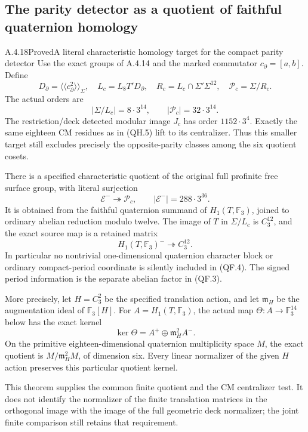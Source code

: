 \subsection{The parity detector as a quotient of faithful quaternion homology}

\begin{result}{A.4.18}{Proved}{A literal characteristic homology target for the compact parity detector}
Use the exact groups of A.4.14 and the marked commutator
$c_\partial=[a,b]$.  Define
\[
 D_\partial=\langle\!\langle c_\partial^2\rangle\!\rangle_\Sigma,
 \quad L_c=L_8T'D_\partial,
 \quad R_c=L_c\cap\Sigma'\Sigma^{12},
 \quad\mathcal P_c=\Sigma/R_c.
                                                        \tag{QF.1}
\]
The actual orders are
\[
 |\Sigma/L_c|=8\cdot3^{14},\qquad
 |\mathcal P_c|=32\cdot3^{14}.                           \tag{QF.2}
\]
The restriction/deck detected modular image $J_c$ has
order $1152\cdot3^4$.  Exactly the same eighteen CM
residues as in (QH.5) lift to its centralizer.  Thus
this smaller target still excludes precisely the
opposite-parity classes among the six quotient cosets.

There is a specified characteristic quotient of the
original full profinite free surface group, with
literal surjection
\[
 \mathcal E^-\twoheadrightarrow\mathcal P_c,
 \qquad |\mathcal E^-|=288\cdot3^{36}.                  \tag{QF.3}
\]
It is obtained from the faithful quaternion summand
of $H_1(T,\mathbb F_3)$, joined to ordinary abelian
reduction modulo twelve.  The image of $T$ in
$\Sigma/L_c$ is $C_3^{12}$, and the exact source map
is a retained matrix
\[
 H_1(T,\mathbb F_3)^-\twoheadrightarrow C_3^{12}.
                                                        \tag{QF.4}
\]
In particular no nontrivial one-dimensional quaternion
character block or ordinary compact-period coordinate
is silently included in (QF.4).  The signed period
information is the separate abelian factor in (QF.3).

More precisely, let $H=C_3^2$ be the specified translation
action, and let $\mathfrak m_H$ be the augmentation ideal
of $\mathbb F_3[H]$.  For $A=H_1(T,\mathbb F_3)$,
the actual map $\Theta:A\to\mathbb F_3^{14}$ below has
the exact kernel
\[
 \ker\Theta=A^+\oplus\mathfrak m_H^2A^-.
                                                       \tag{QF.K1}
\]
On the primitive eighteen-dimensional quaternion
multiplicity space $M$, the exact quotient is
$M/\mathfrak m_H^2M$, of dimension six.  Every linear
normalizer of the given $H$ action preserves this
particular quotient kernel.

This theorem supplies the common finite quotient and
the CM centralizer test.  It does not identify the
normalizer of the finite translation matrices in the
orthogonal image with the image of the full geometric
deck normalizer; the joint finite comparison still
retains that requirement.
\end{result}

